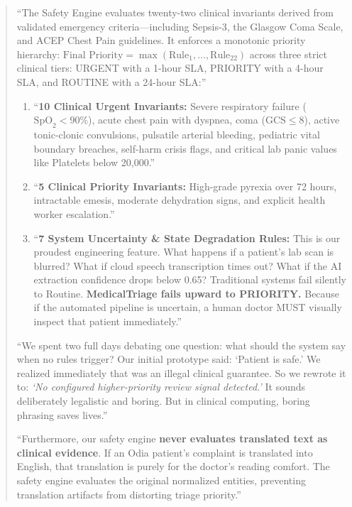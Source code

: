 \documentclass[11pt,a4paper]{article}
\begin{document}
\begin{quote}
``The Safety Engine evaluates twenty-two clinical invariants derived from validated emergency criteria---including Sepsis-3, the Glasgow Coma Scale, and ACEP Chest Pain guidelines. It enforces a monotonic priority hierarchy: $\text{Final Priority} = \max(\text{Rule}_1, \dots, \text{Rule}_{22})$ across three strict clinical tiers: URGENT with a 1-hour SLA, PRIORITY with a 4-hour SLA, and ROUTINE with a 24-hour SLA:''

\begin{enumerate}[leftmargin=18pt]
  \item ``\textbf{10 Clinical Urgent Invariants:} Severe respiratory failure ($\text{SpO}_2 < 90\%$), acute chest pain with dyspnea, coma ($\text{GCS} \le 8$), active tonic-clonic convulsions, pulsatile arterial bleeding, pediatric vital boundary breaches, self-harm crisis flags, and critical lab panic values like Platelets below 20,000.''
  \item ``\textbf{5 Clinical Priority Invariants:} High-grade pyrexia over 72 hours, intractable emesis, moderate dehydration signs, and explicit health worker escalation.''
  \item ``\textbf{7 System Uncertainty \& State Degradation Rules:} This is our proudest engineering feature. What happens if a patient's lab scan is blurred? What if cloud speech transcription times out? What if the AI extraction confidence drops below 0.65? Traditional systems fail silently to Routine. \textbf{MedicalTriage fails upward to PRIORITY.} Because if the automated pipeline is uncertain, a human doctor MUST visually inspect that patient immediately.''
\end{enumerate}

``We spent two full days debating one question: what should the system say when no rules trigger? Our initial prototype said: `Patient is safe.' We realized immediately that was an illegal clinical guarantee. So we rewrote it to: \textit{`No configured higher-priority review signal detected.'} It sounds deliberately legalistic and boring. But in clinical computing, boring phrasing saves lives.''

``Furthermore, our safety engine \textbf{never evaluates translated text as clinical evidence}. If an Odia patient's complaint is translated into English, that translation is purely for the doctor's reading comfort. The safety engine evaluates the original normalized entities, preventing translation artifacts from distorting triage priority.''
\end{quote}
\end{document}
